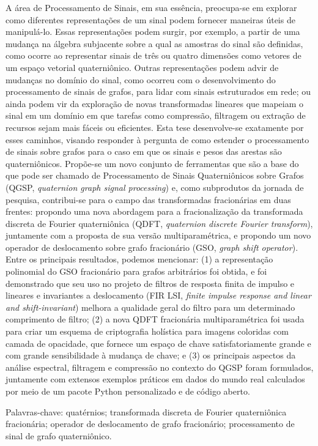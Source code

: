 
%

A área de Processamento de Sinais, em sua essência, preocupa-se em explorar como diferentes representações de um sinal podem fornecer maneiras úteis de manipulá-lo. Essas representações podem surgir, por exemplo, a partir de uma mudança na álgebra subjacente sobre a qual as amostras do sinal são definidas, como ocorre ao representar sinais de três ou quatro dimensões como vetores de um espaço vetorial quaterniônico. Outras representações podem advir de mudanças no domínio do sinal, como ocorreu com o desenvolvimento do processamento de sinais de grafos, para lidar com sinais estruturados em rede; ou ainda podem vir da exploração de novas transformadas lineares que mapeiam o sinal em um domínio em que tarefas como compressão, filtragem ou extração de recursos sejam mais fáceis ou eficientes.
Esta tese desenvolve-se exatamente por esses caminhos, visando responder à pergunta de como estender o processamento de sinais sobre grafos para o caso em que os sinais e pesos das arestas são quaterniônicos. Propõe-se um novo conjunto de ferramentas que são a base do que pode ser chamado de Processamento de Sinais Quaterniônicos sobre Grafos (QGSP, \emph{quaternion graph signal processing}) e, como subprodutos da jornada de pesquisa, contribui-se para o campo das transformadas fracionárias em duas frentes: propondo uma nova abordagem para a fracionalização da transformada discreta de Fourier quaterniônica (QDFT, \emph{quaternion discrete Fourier transform}), juntamente com a proposta de sua versão multiparamétrica, e propondo um novo operador de deslocamento sobre grafo fracionário (GSO, \emph{graph shift operator}).
Entre os principais resultados, podemos mencionar: (1) a representação polinomial do GSO fracionário para grafos arbitrários foi obtida, e foi demonstrado que seu uso no projeto de filtros de resposta finita de impulso e lineares e invariantes a deslocamento (FIR LSI, \emph{finite impulse response and linear and shift-invariant}) melhora a qualidade geral do filtro para um determinado comprimento de filtro; (2) a nova QDFT fracionária multiparamétrica foi usada para criar um esquema de criptografia holística para imagens coloridas com camada de opacidade, que fornece um espaço de chave satisfatoriamente grande e com grande sensibilidade à mudança de chave; e (3) os principais aspectos da análise espectral, filtragem e compressão no contexto do QGSP foram formulados, juntamente com extensos exemplos práticos em dados do mundo real calculados por meio de um pacote Python personalizado e de código aberto.
\vspace{1em}

\noindent
Palavras-chave: quatérnios; transformada discreta de Fourier quaterniônica fracionária; operador de deslocamento de grafo fracionário; processamento de sinal de grafo quaterniônico.